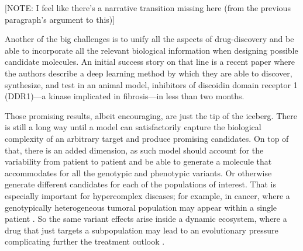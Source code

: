 \documentclass{article}
\begin{document}


{\color{red} [NOTE: I feel like there's a narrative transition missing here (from the
previous paragraph's argument to this)]}

{\color{red}Another of the big challenges is to unify all the aspects of drug-discovery
 and be able to incorporate all the relevant biological information when designing
 possible candidate molecules.} An initial success story on that line is a recent paper
 \cite{Zhavoronkov2019} where the authors describe a deep learning method by which they
 are able to discover, synthesize, and test in an animal model, inhibitors of discoidin
 domain receptor 1 (DDR1)—a kinase implicated in fibrosis—in less than two months.

Those promising results, albeit encouraging, are just the tip of the iceberg. There is
still a long way until a model can satisfactorily capture the biological complexity of
an arbitrary target and produce promising candidates. On top of that, there is an added
dimension, as such model should account for the variability from patient to patient and
be able to generate a molecule that accommodates for all the genotypic and phenotypic
variants. Or otherwise generate different candidates for each of the populations of
interest. That is especially important for hypercomplex diseases; for example, in
cancer, where a genotypically heterogeneous tumoral population may appear within a
single patient \cite{Boland2017}. So the same variant effects arise inside a dynamic
ecosystem, where a drug that just targets a subpopulation may lead to an evolutionary
pressure complicating further the treatment outlook \cite{Enriquez-Navas2015}.
\end{document}

